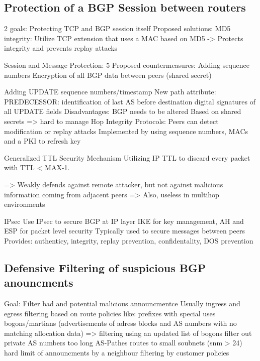 \documentclass[12pt]{IEEEtran}
\begin{document}


	\subsection{Protection of a BGP Session between routers}
	2 goals: Protecting TCP and BGP session itself
		Proposed solutions:
			MD5 integrity: Utilize TCP extension that uses a MAC based on MD5
					-> Protects integrity and prevents replay attacks

			Session and Message Protection:
				5 Proposed countermeasures:
					Adding sequence numbers
					Encryption of all BGP data between peers (shared secret)
					
					Adding UPDATE sequence numbers/timestamp
					New path attribute: PREDECESSOR: identification of last AS before destination
					digital signatures of all UPDATE fields
				Disadvantages: BGP needs to be altered
					       Based on shared secrets => hard to manage
			Hop Integrity Protocols:
				Peers can detect modification or replay attacks	
				Implemented by using sequence numbers, MACs and a PKI to refresh key

			Generalized TTL Security Mechanism
				Utilizing IP TTL to discard every packet with TTL < MAX-1. 
				
				=> Weakly defends against remote attacker, but not against malicious information coming from adjacent peers
				=> Also, useless in multihop environments
				
			IPsec
				Use IPsec to secure BGP at IP layer 
				IKE for key management, AH and ESP for packet level security
				Typically used to secure messages between peers
				Provides: authenticy, integrity, replay prevention, confidentality, DOS prevention
			


       \subsection{Defensive Filtering of suspicious BGP anouncments}
	Goal: Filter bad and potential malicious announcmentce 
	Usually ingress and egress filtering based on route policies like:
			prefixes with special uses
			bogons/martians (advertisements of adress blocks and AS numbers with no matching allocation data)
				=> filtering using an updated list of bogons
			filter out private AS numbers
			too long AS-Pathes
			routes to small soubnets (snm > 24) 
			hard limit of announcments by a neighbour 
			filtering by customer policies
				
\end{document}
